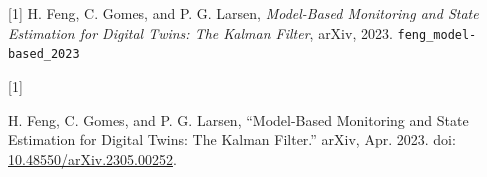 \documentclass[
  12pt,
  a4paper,
]{article}
\newlength{\cslhangindent}
\newlength{\csllabelwidth}
\newenvironment{CSLReferences}[2] %
 {\begin{list}{}{%
  \setlength{\itemindent}{0pt}
  \setlength{\leftmargin}{0pt}
  \setlength{\parsep}{0pt}
  \ifodd #1
   \setlength{\leftmargin}{\cslhangindent}
   \setlength{\itemindent}{-1\cslhangindent}
  \fi
  \setlength{\itemsep}{#2\baselineskip}}}
 {\end{list}}
\newcommand{\CSLLeftMargin}[1]{\parbox[t]{\csllabelwidth}{\strut#1\strut}}
\newcommand{\CSLRightInline}[1]{\parbox[t]{\linewidth - \csllabelwidth}{\strut#1\strut}}
\begin{document}
{[}1{]} H. Feng, C. Gomes, and P. G. Larsen, \emph{Model-Based
Monitoring and State Estimation for Digital Twins: The Kalman Filter},
arXiv, 2023. \texttt{feng\_model-based\_2023}

\protect{}\label{refs}
\begin{CSLReferences}{0}{0}
\CSLLeftMargin{{[}1{]} }%
\CSLRightInline{H. Feng, C. Gomes, and P. G. Larsen, {``Model-{Based}
{Monitoring} and {State} {Estimation} for {Digital} {Twins}: {The}
{Kalman} {Filter}.''} arXiv, Apr. 2023. doi:
\href{https://doi.org/10.48550/arXiv.2305.00252}{10.48550/arXiv.2305.00252}.}

\end{CSLReferences}
\end{document}

